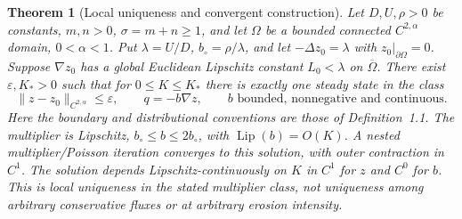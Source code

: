 \documentclass[11pt,a4paper]{article}
\newtheorem{theorem}{Theorem}[section]
\theoremstyle{definition}\newtheorem{definition}[theorem]{Definition}
\theoremstyle{remark}\newtheorem{remark}[theorem]{Remark}
\newcommand{\cl}{\overline}
\begin{document}
\begin{theorem}[Local uniqueness and convergent construction]\label{thm:localunique}
Let $D,U,\rho>0$ be constants, $m,n>0$, $\sigma=m+n\geq1$, and let
$\Omega$ be a bounded connected $C^{2,\alpha}$ domain, $0<\alpha<1$.
Put $\lambda=U/D$, $b_\circ=\rho/\lambda$, and let
$-\Delta z_0=\lambda$ with $z_0|_{\partial\Omega}=0$.
Suppose $\nabla z_0$ has a global Euclidean Lipschitz constant
$L_0<\lambda$ on $\cl\Omega$.
There exist $\varepsilon,K_*>0$ such that for $0\leq K\leq K_*$ there is
exactly one steady state in the class
\[
 \|z-z_0\|_{C^{2,\alpha}}\leq\varepsilon,\qquad
 q=-b\nabla z,\qquad b\text{ bounded, nonnegative and continuous}.
\]
Here the boundary and distributional conventions are those of Definition~1.1.
The multiplier is Lipschitz, $b_\circ\leq b\leq2b_\circ$, with
$\operatorname{Lip}(b)=O(K)$. A nested multiplier/Poisson iteration converges
to this solution, with outer contraction in $C^1$.
The solution depends Lipschitz-continuously on $K$ in $C^1$ for $z$ and $C^0$
for $b$. This is local uniqueness in the stated multiplier class, not
uniqueness among arbitrary conservative fluxes or at arbitrary erosion intensity.
\end{theorem}
\end{document}
